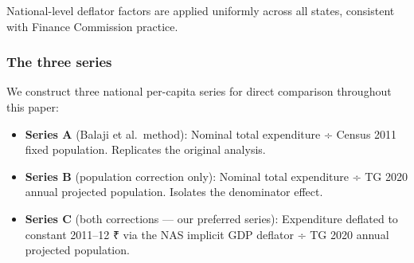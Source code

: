 \documentclass[
  11pt,
  oneside,
  10pt,
  a4paper,
  twocolumn]{article}
\providecommand{\tightlist}{%
  \setlength{\itemsep}{0pt}\setlength{\parskip}{0pt}}
\begin{document}
\begin{table}

\caption{\label{tbl-deflators}MoSPI implicit GDP deflator factors
(constant 2011--12 ÷ current prices). Source: National Accounts
Statistics, MoSPI.}


\end{table}%

National-level deflator factors are applied uniformly across all states,
consistent with Finance Commission practice.

\subsubsection{The three series}\label{the-three-series}

We construct three national per-capita series for direct comparison
throughout this paper:

\begin{itemize}
\tightlist
\item
  \textbf{Series A} (Balaji et al.~method): Nominal total expenditure ÷
  Census 2011 fixed population. Replicates the original analysis.
\item
  \textbf{Series B} (population correction only): Nominal total
  expenditure ÷ TG 2020 annual projected population. Isolates the
  denominator effect.
\item
  \textbf{Series C} (both corrections --- our preferred series):
  Expenditure deflated to constant 2011--12 ₹ via the NAS implicit GDP
  deflator ÷ TG 2020 annual projected population.
\end{itemize}
\end{document}
